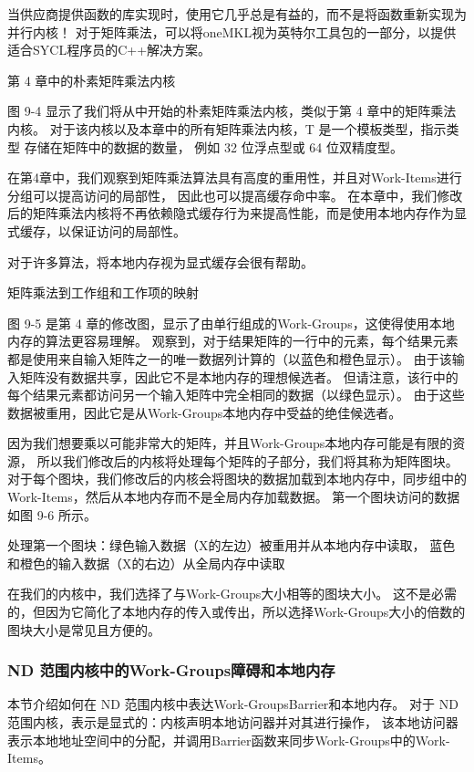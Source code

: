 \begin{remark}[使用供应商提供的库！]
当供应商提供函数的库实现时，使用它几乎总是有益的，而不是将函数重新实现为并行内核！
对于矩阵乘法，可以将oneMKL视为英特尔工具包的一部分，以提供适合SYCL程序员的C++解决方案。
\end{remark}

{\color{red} 第 4 章中的朴素矩阵乘法内核}

图 9-4 显示了我们将从中开始的朴素矩阵乘法内核，类似于第 4 章中的矩阵乘法内核。
对于该内核以及本章中的所有矩阵乘法内核，T 是一个模板类型，指示类型 存储在矩阵中的数据的数量，
例如 32 位浮点型或 64 位双精度型。

在第4章中，我们观察到矩阵乘法算法具有高度的重用性，并且对Work-Items进行分组可以提高访问的局部性，
因此也可以提高缓存命中率。 
在本章中，我们修改后的矩阵乘法内核将不再依赖隐式缓存行为来提高性能，而是使用本地内存作为显式缓存，以保证访问的局部性。

\begin{remark}
	对于许多算法，将本地内存视为显式缓存会很有帮助。
\end{remark}

{\color{red} 矩阵乘法到工作组和工作项的映射}

图 9-5 是第 4 章的修改图，显示了由单行组成的Work-Groups，这使得使用本地内存的算法更容易理解。 
观察到，对于结果矩阵的一行中的元素，每个结果元素都是使用来自输入矩阵之一的唯一数据列计算的（以蓝色和橙色显示）。 
由于该输入矩阵没有数据共享，因此它不是本地内存的理想候选者。 
但请注意，该行中的每个结果元素都访问另一个输入矩阵中完全相同的数据（以绿色显示）。 
由于这些数据被重用，因此它是从Work-Groups本地内存中受益的绝佳候选者。

因为我们想要乘以可能非常大的矩阵，并且Work-Groups本地内存可能是有限的资源，
所以我们修改后的内核将处理每个矩阵的子部分，我们将其称为矩阵图块。 
对于每个图块，我们修改后的内核会将图块的数据加载到本地内存中，同步组中的Work-Items，然后从本地内存而不是全局内存加载数据。 
第一个图块访问的数据如图 9-6 所示。

{\color{red} 处理第一个图块：绿色输入数据（X的左边）被重用并从本地内存中读取，
蓝色和橙色的输入数据（X的右边）从全局内存中读取}

在我们的内核中，我们选择了与Work-Groups大小相等的图块大小。 
这不是必需的，但因为它简化了本地内存的传入或传出，所以选择Work-Groups大小的倍数的图块大小是常见且方便的。

\subsubsection{ND 范围内核中的Work-Groups障碍和本地内存}
本节介绍如何在 ND 范围内核中表达Work-GroupsBarrier和本地内存。 
对于 ND 范围内核，表示是显式的：内核声明本地访问器并对其进行操作，
该本地访问器表示本地地址空间中的分配，并调用Barrier函数来同步Work-Groups中的Work-Items。

